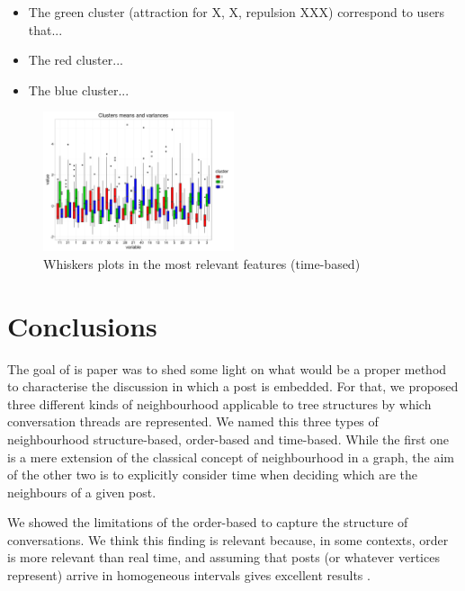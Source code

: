 \documentclass[conference]{IEEEtran}
\begin{document}
\begin{itemize}
\item The green cluster (attraction for X, X, repulsion XXX) correspond to users that...
\item The red cluster...
\item The blue cluster...
\end{itemize}

\begin{figure}
	\centering
	\includegraphics[width=0.5\textwidth]{whiskers}
	\caption{Whiskers plots in the most relevant features (time-based)}
	\label{fig:whiskers}
\end{figure}




\section{Conclusions}
The goal of is paper was to shed some light on what would be a proper method to characterise the discussion in which a post is embedded. For that, we proposed three different kinds of neighbourhood applicable to tree structures by which conversation threads are represented. We named this three types of neighbourhood structure-based, order-based and time-based. While the first one is a mere extension of the classical concept of neighbourhood in a graph, the aim of the other two is to explicitly consider time when deciding which are the neighbours of a given post.

We showed the limitations of the order-based to capture the structure of conversations. We think this finding is relevant because, in some contexts, order is more relevant than real time, and assuming that posts (or whatever vertices represent) arrive in homogeneous intervals gives excellent results \cite{Gomez2012}.
\end{document}

